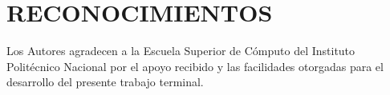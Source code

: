 \section*{RECONOCIMIENTOS}

Los Autores agradecen a la Escuela Superior de Cómputo del Instituto Politécnico Nacional por el apoyo recibido y las facilidades otorgadas para el desarrollo del presente trabajo terminal.